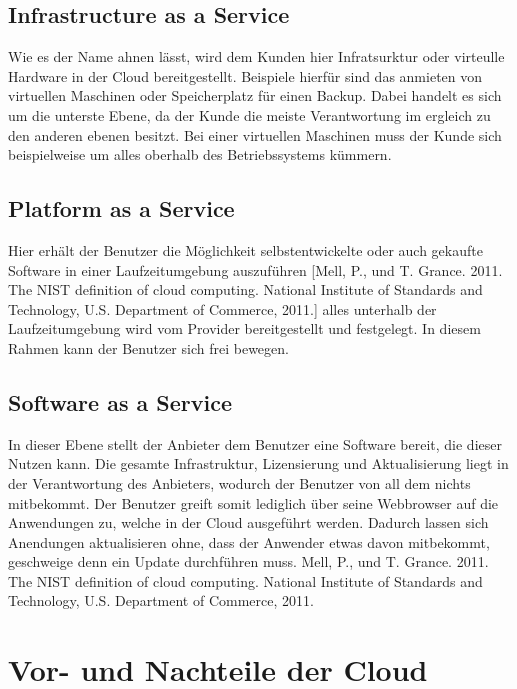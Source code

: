 \subsection{Infrastructure as a Service}
Wie es der Name ahnen lässt, wird dem Kunden hier Infratsurktur oder virteulle Hardware in der Cloud bereitgestellt. Beispiele hierfür sind das anmieten von virtuellen Maschinen oder Speicherplatz für einen Backup. Dabei handelt es sich um die unterste Ebene, da der Kunde die meiste Verantwortung im ergleich zu den anderen ebenen besitzt. Bei einer virtuellen Maschinen muss der Kunde sich beispielweise um alles oberhalb des Betriebssystems kümmern.
\subsection{Platform as a Service}
Hier erhält der Benutzer die Möglichkeit selbstentwickelte oder auch gekaufte Software in einer Laufzeitumgebung auszuführen [Mell, P., und T. Grance. 2011. The NIST definition of cloud computing. National Institute of Standards and Technology, U.S. Department of Commerce, 2011.]%
alles unterhalb der Laufzeitumgebung wird vom Provider bereitgestellt und festgelegt. In diesem Rahmen kann der Benutzer sich frei bewegen.
\subsection{Software as a Service}
In dieser Ebene stellt der Anbieter dem Benutzer eine Software bereit, die dieser Nutzen kann. Die gesamte Infrastruktur, Lizensierung und Aktualisierung liegt in der Verantwortung des Anbieters, wodurch der Benutzer von all dem nichts mitbekommt. Der Benutzer greift somit lediglich über seine Webbrowser auf die Anwendungen zu, welche in der Cloud ausgeführt werden. Dadurch lassen sich Anendungen aktualisieren ohne, dass der Anwender etwas davon mitbekommt, geschweige denn ein Update durchführen muss. Mell, P., und T. Grance. 2011. The NIST definition of cloud computing. National Institute of Standards and Technology, U.S. Department of Commerce, 2011.
\section{Vor- und Nachteile der Cloud}